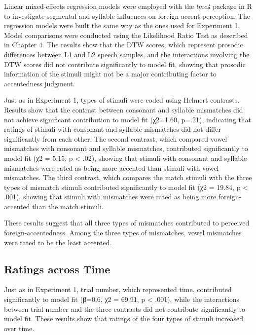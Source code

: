 Linear mixed-effects regression models were employed with the \textit{lme4} package in R \citep{Bates_2014} to investigate segmental and syllable influences on foreign accent perception. The regression models were built the same way as the ones used for Experiment 1. Model comparisons were conducted using the Likelihood Ratio Test as described in Chapter 4. The results show that the DTW scores, which represent prosodic differences between L1 and L2 speech samples, and the interactions involving the DTW scores did not contribute significantly to model fit, showing that prosodic information of the stimuli might not be a major contributing factor to accentedness judgment. 

Just as in Experiment 1, types of stimuli were coded using Helmert contrasts. Results show that the contrast between consonant and syllable mismatches did not achieve significant contribution to model fit (χ2=1.60, p=.21), indicating that ratings of stimuli with consonant and syllable mismatches did not differ significantly from each other. The second contrast, which compared vowel mismatches with consonant and syllable mismatches, contributed significantly to model fit (χ2 = 5.15, p < .02), showing that stimuli with consonant and syllable mismatches were rated as being more accented than stimuli with vowel mismatches. The third contrast, which compares the match stimuli with the three types of mismatch stimuli contributed significantly to model fit (χ2 = 19.84, p < .001), showing that stimuli with mismatches were rated as being more foreign-accented than the match stimuli.

These results suggest that all three types of mismatches contributed to perceived foreign-accentedness. Among the three types of mismatches, vowel mismatches were rated to be the least accented. 

\subsection{Ratings across Time}

Just as in Experiment 1, trial number, which represented time, contributed significantly to model fit (β=0.6, χ2 = 69.91, p < .001), while the interactions between trial number and the three contrasts did not contribute significantly to model fit. These results show that ratings of the four types of stimuli increased over time.

